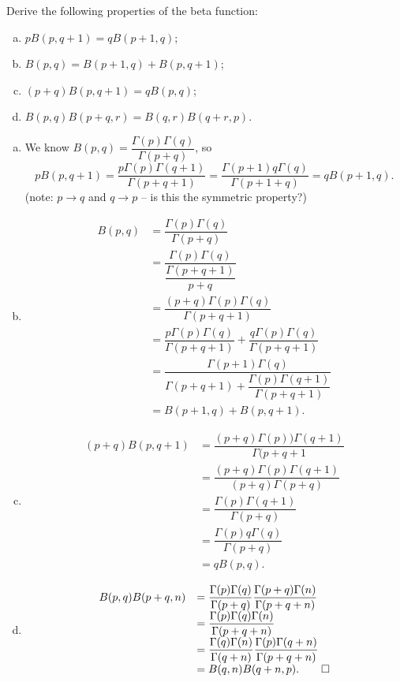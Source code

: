\begin{problem}\label{problem5chapter2}
Derive the following properties of the beta function: 
\begin{enumerate}[(a)]
\item $pB(p,q+1) = qB(p+1,q)$;
\item $B(p,q) = B(p+1,q) + B(p,q+1)$;
\item $(p+q)B(p,q+1) = qB(p,q)$;
\item $B(p,q)B(p+q,r) = B(q,r)B(q+r,p)$.
\end{enumerate}
\end{problem}
\begin{solution}
\begin{enumerate}[(a)]
\item We know $B(p,q) = \dfrac{\Gamma(p)\Gamma(q)}{\Gamma(p+q)}$, so
$$pB(p,q+1) = \dfrac{p \Gamma(p)\Gamma(q+1)}{\Gamma(p+q+1)} = \dfrac{\Gamma(p+1) q \Gamma(q)}{\Gamma(p+1+q)} = qB(p+1,q).$$
(note: $p \rightarrow q$ and $q \rightarrow p$ -- is this the symmetric property?)
\item
$$\begin{array}{ll}
B(p,q) &= \dfrac{\Gamma(p)\Gamma(q)}{\Gamma(p+q)} \\
&= \dfrac{\Gamma(p)\Gamma(q)}{\dfrac{\Gamma(p+q+1)}{p+q}} \\
&= \dfrac{(p+q)\Gamma(p)\Gamma(q)}{\Gamma(p+q+1)} \\
&= \dfrac{p \Gamma(p)\Gamma(q)}{\Gamma(p+q+1)} + \dfrac{q \Gamma(p) \Gamma(q)}{\Gamma(p+q+1)} \\
&= \dfrac{\Gamma(p+1) \Gamma(q)}{\Gamma(p+q+1) + \dfrac{\Gamma(p) \Gamma(q+1)}{\Gamma(p+q+1)}} \\
&= B(p+1,q) + B(p,q+1).
\end{array}$$
\item $$\begin{array}{ll}
(p+q)B(p,q+1) &= \dfrac{(p+q)\Gamma(p))\Gamma(q+1)}{\Gamma(p+q+1} \\
&= \dfrac{(p+q)\Gamma(p) \Gamma(q+1)}{(p+q) \Gamma(p+q)} \\
&= \dfrac{\Gamma(p) \Gamma(q+1)}{\Gamma(p+q)} \\
&= \dfrac{\Gamma(p) q \Gamma(q)}{\Gamma(p+q)} \\
&= qB(p,q).
\end{array}$$
\item $$\begin{array}{ll}
B(p,q)B(p+q,n) &= \dfrac{\Gamma(p)\Gamma(q)}{\Gamma(p+q)} \dfrac{\Gamma(p+q)\Gamma(n)}{\Gamma(p+q+n)} \\
&= \dfrac{\Gamma(p)\Gamma(q)\Gamma(n)}{\Gamma(p+q+n)} \\
&= \dfrac{\Gamma(q)\Gamma(n)}{\Gamma(q+n)} \dfrac{\Gamma(p)\Gamma(q+n)}{\Gamma(p+q+n)} \\
&= B(q,n) B(q+n,p). \qed
\end{array}$$
\end{enumerate}
\end{solution}%
